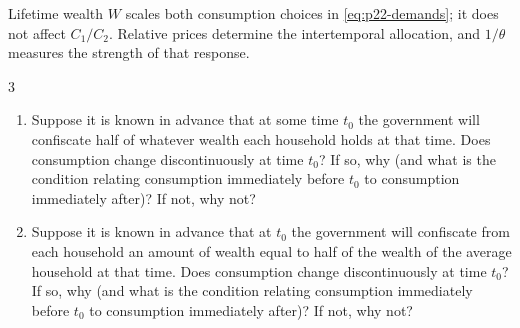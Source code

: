 \begin{note}
    Lifetime wealth \(W\) scales both consumption choices in
    \eqref{eq:p22-demands}; it does not affect \(C_1/C_2\). Relative prices
    determine the intertemporal allocation, and \(1/\theta\) measures the
    strength of that response.
\end{note}

\begin{problem}{3}
\begin{enumerate}[label=(\alph*)]
    \item Suppose it is known in advance that at some time \(t_0\) the government will confiscate half of whatever wealth each household holds at that time. Does consumption change discontinuously at time \(t_0\)? If so, why (and what is the condition relating consumption immediately before \(t_0\) to consumption immediately after)? If not, why not?
    \item Suppose it is known in advance that at \(t_0\) the government will confiscate from each household an amount of wealth equal to half of the wealth of the average household at that time. Does consumption change discontinuously at time \(t_0\)? If so, why (and what is the condition relating consumption immediately before \(t_0\) to consumption immediately after)? If not, why not?
\end{enumerate}
\end{problem}

